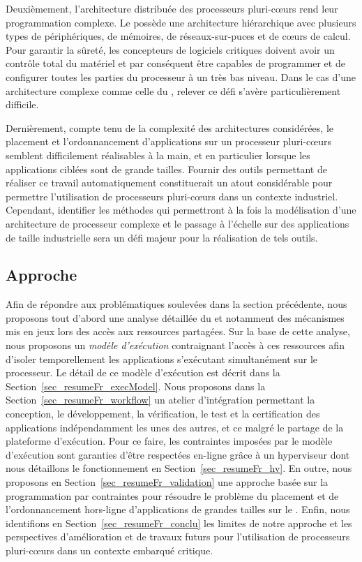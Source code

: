 \documentclass[main.tex]{subfiles}
\begin{document}
Deuxièmement, l'architecture distribuée des processeurs pluri-c\oe{}urs rend leur programmation complexe. Le \mppalong possède une architecture hiérarchique avec plusieurs types de périphériques, de mémoires, de réseaux-sur-puces et de c\oe{}urs de calcul. Pour garantir la sûreté, les concepteurs de logiciels critiques doivent avoir un contrôle total du matériel et par conséquent être capables de programmer et de configurer toutes les parties du processeur à un très bas niveau. Dans le cas d'une architecture complexe comme celle du \mppalong, relever ce défi s'avère particulièrement difficile.

Dernièrement, compte tenu de la complexité des architectures considérées, le placement et l'ordonnancement d'applications sur un processeur pluri-c\oe{}urs semblent difficilement réalisables à la main, et en particulier lorsque les applications ciblées sont de grande tailles. Fournir des outils permettant de réaliser ce travail automatiquement constituerait un atout considérable pour permettre l'utilisation de processeurs pluri-c\oe{}urs dans un contexte industriel. Cependant, identifier les méthodes qui permettront à la fois la modélisation d'une architecture de processeur complexe et le passage à l'échelle sur des applications de taille industrielle sera un défi majeur pour la réalisation de tels outils.



\subsection{Approche}

Afin de répondre aux problématiques soulevées dans la section précédente, nous proposons tout d'abord une analyse détaillée du \mppalong et notamment des mécanismes mis en jeux lors des accès aux ressources partagées. Sur la base de cette analyse, nous proposons un \emph{modèle d'exécution} contraignant l'accès à ces ressources afin d'isoler temporellement les applications s'exécutant simultanément sur le processeur. Le détail de ce modèle d'exécution est décrit dans la Section~\ref{sec_resumeFr_execModel}. Nous proposons dans la Section~\ref{sec_resumeFr_workflow} un atelier d'intégration permettant la conception, le développement, la vérification, le test et la certification des applications indépendamment les unes des autres, et ce malgré le partage de la plateforme d'exécution. Pour ce faire, les contraintes imposées par le modèle d'exécution sont garanties d'être respectées en-ligne grâce à un hyperviseur dont nous détaillons le fonctionnement en Section~\ref{sec_resumeFr_hv}. En outre, nous proposons en Section~\ref{sec_resumeFr_validation} une approche basée sur la programmation par contraintes pour résoudre le problème du placement et de l'ordonnancement hors-ligne d'applications de grandes tailles sur le \mppalong. Enfin, nous identifions en Section~\ref{sec_resumeFr_conclu} les limites de notre approche et les perspectives d'amélioration et de travaux futurs pour l'utilisation de processeurs pluri-c\oe{}urs dans un contexte embarqué critique.
\end{document}
